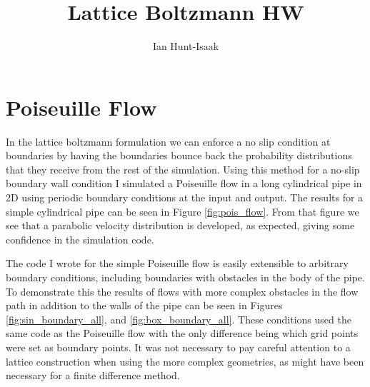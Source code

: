 \documentclass[]{article}
\title{Lattice Boltzmann HW}
\author{Ian Hunt-Isaak}
\date{}
\begin{document}
\maketitle

\section{Poiseuille Flow}
In the lattice boltzmann formulation we can enforce a no slip condition at boundaries by having the boundaries bounce back the probability distributions that they receive from the rest of the simulation. Using this method for a no-slip boundary wall condition I simulated a Poiseuille flow in a long cylindrical pipe in 2D using periodic boundary conditions at the input and output. The results for a simple cylindrical pipe can be seen in Figure \ref{fig:pois_flow}. From that figure we see that a parabolic velocity distribution is developed, as expected, giving some confidence in the simulation code. 

The code I wrote for the simple Poiseuille flow is easily extensible to arbitrary boundary conditions, including boundaries with obstacles in the body of the pipe. To demonstrate this the results of flows with more complex obstacles in the flow path in addition to the walls of the pipe can be seen in Figures \ref{fig:sin_boundary_all}, and \ref{fig:box_boundary_all}. These conditions used the same code as the Poiseuille flow with the only difference being which grid points were set as boundary points. It was not necessary to pay careful attention to a lattice construction when using the more complex geometries, as might have been necessary for a finite difference method.
\end{document}
